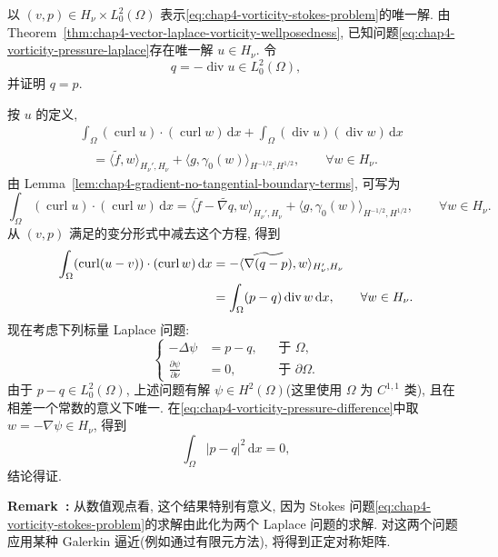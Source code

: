 \begin{Proof}
以 $(v,p)\in H_\nu\times L_0^2(\Omega)$ 表示\eqref{eq:chap4-vorticity-stokes-problem}的唯一解. 由 Theorem~\ref{thm:chap4-vector-laplace-vorticity-wellposedness}, 已知问题\eqref{eq:chap4-vorticity-pressure-laplace}存在唯一解 $u\in H_\nu$. 令
\[
 q=-\operatorname{div}u\in L_0^2(\Omega),
\]
并证明 $q=p$.

按 $u$ 的定义,
\begin{align*}
 &\int_\Omega(\operatorname{curl}u)\cdot(\operatorname{curl}w)\,\mathrm dx
 +\int_\Omega(\operatorname{div}u)(\operatorname{div}w)\,\mathrm dx\\
 &\quad=\langle\widetilde f,w\rangle_{H_\nu',H_\nu}
 +\langle g,\gamma_0(w)\rangle_{H^{-1/2},H^{1/2}},
 \qquad\forall w\in H_\nu.
\end{align*}
由 Lemma~\ref{lem:chap4-gradient-no-tangential-boundary-terms}, 可写为
\[
 \int_\Omega(\operatorname{curl}u)\cdot(\operatorname{curl}w)\,\mathrm dx
 =\langle\widetilde f-\widetilde{\nabla q},w\rangle_{H_\nu',H_\nu}
 +\langle g,\gamma_0(w)\rangle_{H^{-1/2},H^{1/2}},
 \qquad\forall w\in H_\nu.
\]
从 $(v,p)$ 满足的变分形式中减去这个方程, 得到
\begin{align}
 \int_\Omega(\operatorname{curl}(u-v))\cdot(\operatorname{curl}w)\,\mathrm dx
 &=-\langle\widetilde{\nabla(q-p)},w\rangle_{H_\nu',H_\nu}\notag\\
 &=\int_\Omega(p-q)\operatorname{div}w\,\mathrm dx,
 \qquad\forall w\in H_\nu.
 \label{eq:chap4-vorticity-pressure-difference}
\end{align}
现在考虑下列标量 Laplace 问题:
\[
 \left\{
 \begin{aligned}
  -\Delta\psi&=p-q,&&\text{于 }\Omega,\\
  \frac{\partial\psi}{\partial\nu}&=0,&&\text{于 }\partial\Omega.
 \end{aligned}
 \right.
\]
由于 $p-q\in L_0^2(\Omega)$, 上述问题有解 $\psi\in H^2(\Omega)$(这里使用 $\Omega$ 为 $C^{1,1}$ 类), 且在相差一个常数的意义下唯一. 在\eqref{eq:chap4-vorticity-pressure-difference}中取 $w=-\nabla\psi\in H_\nu$, 得到
\[
 \int_\Omega|p-q|^2\,\mathrm dx=0,
\]
结论得证.
\end{Proof}

\par\noindent{}\textbf{Remark~\thechapterfoursectionnineremark:}\label{rem:chap4-vorticity-numerical-decoupling}\quad
从数值观点看, 这个结果特别有意义, 因为 Stokes 问题\eqref{eq:chap4-vorticity-stokes-problem}的求解由此化为两个 Laplace 问题的求解. 对这两个问题应用某种 Galerkin 逼近(例如通过有限元方法), 将得到正定对称矩阵.

